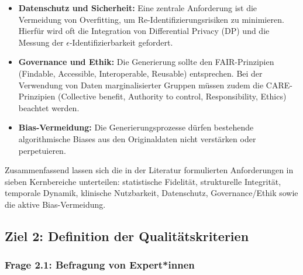\begin{description}[style=nextline, font=\bfseries]
\begin{itemize}[leftmargin=1.5em, labelsep=0.5em, itemsep=4pt, topsep=4pt]
    \item \textbf{Datenschutz und Sicherheit:} Eine zentrale Anforderung ist die Vermeidung von Overfitting, um Re-Identifizierungsrisiken zu minimieren. Hierfür wird oft die Integration von Differential Privacy (DP) und die Messung der $\epsilon$-Identifizierbarkeit gefordert. \citep{tsao_health_2023} \citep{hahn_contribution_2022} \citep{chen_generating_2025}
    
    \item \textbf{Governance und Ethik:} Die Generierung sollte den FAIR-Prinzipien (Findable, Accessible, Interoperable, Reusable) entsprechen. Bei der Verwendung von Daten marginalisierter Gruppen müssen zudem die CARE-Prinzipien (Collective benefit, Authority to control, Responsibility, Ethics) beachtet werden. \citep{tsao_health_2023}
    
    \item \textbf{Bias-Vermeidung:} Die Generierungsprozesse dürfen bestehende algorithmische Biases aus den Originaldaten nicht verstärken oder perpetuieren. \citep{theodorou_synthesize_2023}
    \end{itemize}

    \item[Beantwortung] 
    Zusammenfassend lassen sich die in der Literatur formulierten Anforderungen in sieben Kernbereiche unterteilen: statistische Fidelität, strukturelle Integrität, temporale Dynamik, klinische Nutzbarkeit, Datenschutz, Governance/Ethik sowie die aktive Bias-Vermeidung.

\end{description}

\subsection{Ziel 2: Definition der Qualitätskriterien}

\subsubsection{Frage 2.1: Befragung von Expert*innen}

